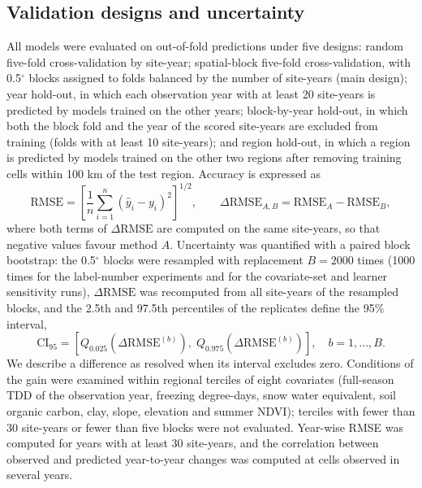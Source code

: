 \subsection{Validation designs and uncertainty}
All models were evaluated on out-of-fold predictions under five designs\cite{Roberts2017,Ploton2020}: random five-fold cross-validation by site-year; spatial-block five-fold cross-validation, with 0.5$^\circ$ blocks assigned to folds balanced by the number of site-years (main design); year hold-out, in which each observation year with at least 20 site-years is predicted by models trained on the other years; block-by-year hold-out, in which both the block fold and the year of the scored site-years are excluded from training (folds with at least 10 site-years); and region hold-out, in which a region is predicted by models trained on the other two regions after removing training cells within 100 km of the test region. Accuracy is expressed as
\begin{equation}
\mathrm{RMSE} = \left[ \frac{1}{n} \sum_{i=1}^{n} \left( \hat{y}_i - y_i \right)^{2} \right]^{1/2}, \qquad \Delta\mathrm{RMSE}_{A,B} = \mathrm{RMSE}_{A} - \mathrm{RMSE}_{B},
\label{eq:rmse}
\end{equation}
where both terms of $\Delta\mathrm{RMSE}$ are computed on the same site-years, so that negative values favour method $A$. Uncertainty was quantified with a paired block bootstrap: the 0.5$^\circ$ blocks were resampled with replacement $B=2000$ times (1000 times for the label-number experiments and for the covariate-set and learner sensitivity runs), $\Delta\mathrm{RMSE}$ was recomputed from all site-years of the resampled blocks, and the 2.5th and 97.5th percentiles of the replicates define the 95\% interval,
\begin{equation}
\mathrm{CI}_{95} = \left[ Q_{0.025}\!\left( \Delta\mathrm{RMSE}^{(b)} \right),\; Q_{0.975}\!\left( \Delta\mathrm{RMSE}^{(b)} \right) \right], \quad b = 1,\ldots,B.
\label{eq:ci}
\end{equation}
We describe a difference as resolved when its interval excludes zero. Conditions of the gain were examined within regional terciles of eight covariates (full-season TDD of the observation year, freezing degree-days, snow water equivalent, soil organic carbon, clay, slope, elevation and summer NDVI); terciles with fewer than 30 site-years or fewer than five blocks were not evaluated. Year-wise RMSE was computed for years with at least 30 site-years, and the correlation between observed and predicted year-to-year changes was computed at cells observed in several years.

